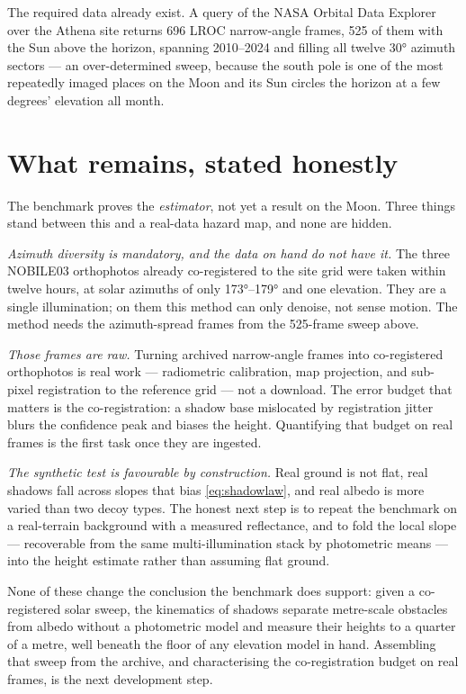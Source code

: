 \documentclass[11pt]{article}
\begin{document}
The required data already exist. A query of the NASA Orbital Data Explorer over the Athena
site returns \num{696} LROC narrow-angle frames, \num{525} of them with the Sun above the
horizon, spanning \SIrange{2010}{2024}{} and filling all twelve \ang{30} azimuth sectors ---
an over-determined sweep, because the south pole is one of the most repeatedly imaged places
on the Moon and its Sun circles the horizon at a few degrees' elevation all month.

\section{What remains, stated honestly}
\label{sec:limits}

\begin{limitbox}
The benchmark proves the \emph{estimator}, not yet a result on the Moon. Three things stand
between this and a real-data hazard map, and none are hidden.

\emph{Azimuth diversity is mandatory, and the data on hand do not have it.} The three
NOBILE03 orthophotos already co-registered to the site grid were taken within twelve hours,
at solar azimuths of only \ang{173}--\ang{179} and one elevation. They are a single
illumination; on them this method can only denoise, not sense motion. The method needs the
azimuth-spread frames from the \num{525}-frame sweep above.

\emph{Those frames are raw.} Turning archived narrow-angle frames into co-registered
orthophotos is real work --- radiometric calibration, map projection, and sub-pixel
registration to the reference grid --- not a download. The error budget that matters is the
co-registration: a shadow base mislocated by registration jitter blurs the confidence peak
and biases the height. Quantifying that budget on real frames is the first task once they are
ingested.

\emph{The synthetic test is favourable by construction.} Real ground is not flat, real
shadows fall across slopes that bias \cref{eq:shadowlaw}, and real albedo is more varied than
two decoy types. The honest next step is to repeat the benchmark on a real-terrain background
with a measured reflectance, and to fold the local slope --- recoverable from the same
multi-illumination stack by photometric means --- into the height estimate rather than
assuming flat ground.
\end{limitbox}

\noindent
None of these change the conclusion the benchmark does support: given a co-registered solar
sweep, the kinematics of shadows separate metre-scale obstacles from albedo without a
photometric model and measure their heights to a quarter of a metre, well beneath the floor
of any elevation model in hand. Assembling that sweep from the archive, and characterising
the co-registration budget on real frames, is the next development step.
\end{document}

